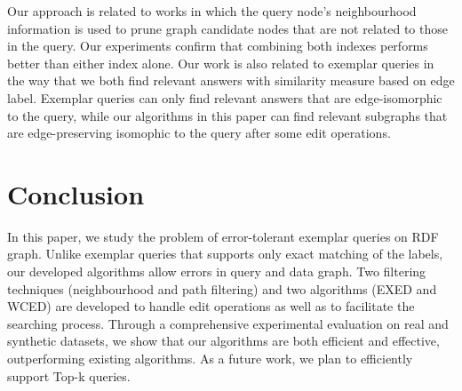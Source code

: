 \documentclass{sigmod}
\begin{document}
Our approach is related to works in  which the query node's neighbourhood information is used to prune graph candidate nodes that  are not related to those in the query\cite{khan2011neighborhood}. Our experiments confirm that combining both indexes performs better than either index alone. Our work is also related to exemplar queries in the way that we both find relevant answers with similarity measure based on edge label. Exemplar queries can only find relevant answers that are edge-isomorphic to the query, while our algorithms in this paper can find relevant subgraphs that are edge-preserving isomophic to the query after some edit operations. 

\section{Conclusion}
In this paper, we study the problem of error-tolerant exemplar queries on RDF graph. Unlike exemplar queries that supports only exact matching of the labels, our developed algorithms allow errors in  query and data graph. Two filtering techniques (neighbourhood and path filtering) and two algorithms (EXED and WCED) are developed to handle edit operations as well as to facilitate the searching process. Through a comprehensive experimental evaluation on real and synthetic datasets, we show that our algorithms are both efficient and effective, outperforming existing algorithms.  As a future work, we plan to efficiently support Top-k queries. 
%
%
%
\def\thebibliography#1{
    \section*{References}
    \footnotesize
    \list
    {[\arabic{enumi}]}
    {\settowidth\labelwidth{[#1]}
        \leftmargin\labelwidth
        \parsep 0pt                %
        \itemsep 0pt              %
        \advance\leftmargin\labelsep
        \usecounter{enumi}
    }
    \def\newblock{\hskip .11em plus .33em minus .07em}
    \sloppy\clubpenalty10000\widowpenalty10000
    \sfcode`\.=1000\relax
} 


%
%
\appendix
\end{document}

